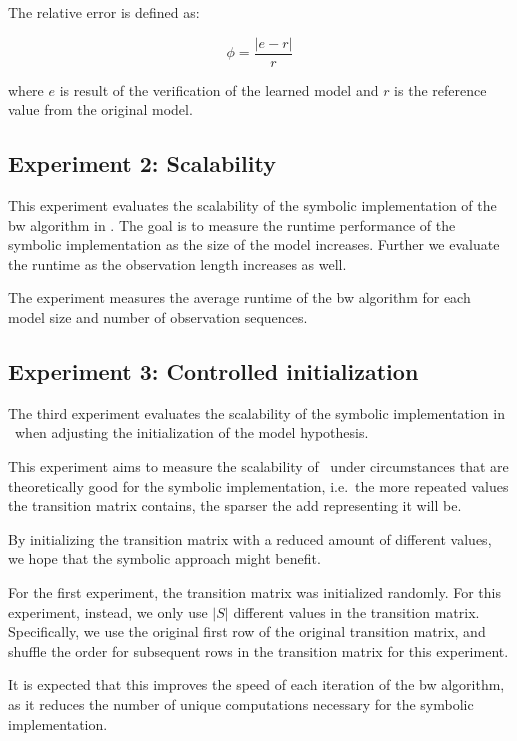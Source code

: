 The relative error is defined as:


\begin{equation}
    \phi = \frac{|e - r|}{r}
\end{equation}


where $e$ is result of the verification of the learned model and $r$ is the reference value from the original model.

\subsection{Experiment 2: Scalability}\label{sec:exp_scalability}
This experiment evaluates the scalability of the symbolic implementation of the \gls{bw} algorithm in \Cupaal.
The goal is to measure the runtime performance of the symbolic implementation as the size of the model increases.
Further we evaluate the runtime as the observation length increases as well.

The experiment measures the average runtime of the \gls{bw} algorithm for each model size and number of observation sequences.

\subsection{Experiment 3: Controlled initialization}\label{sec:exp_extra_scalability}
The third experiment evaluates the scalability of the symbolic implementation in \Cupaal\ when adjusting the initialization of the model hypothesis.

This experiment aims to measure the scalability of \Cupaal\ under circumstances that are theoretically good for the symbolic implementation, i.e.\ the more repeated values the transition matrix contains, the sparser the \gls{add} representing it will be.

By initializing the transition matrix with a reduced amount of different values, we hope that the symbolic approach might benefit.

For the first experiment, the transition matrix was initialized randomly.
For this experiment, instead, we only use $|S|$ different values in the transition matrix.
Specifically, we use the original first row of the original transition matrix, and shuffle the order for subsequent rows in the transition matrix for this experiment.

It is expected that this improves the speed of each iteration of the \gls{bw} algorithm, as it reduces the number of unique computations necessary for the symbolic implementation.
